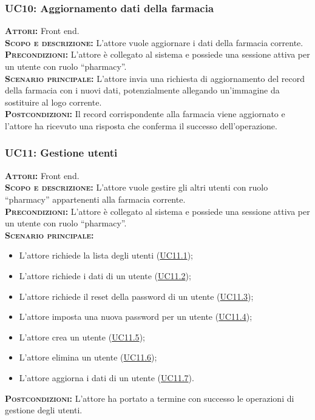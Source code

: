 \subsubsection{UC10: Aggiornamento dati della farmacia}
\label{sec:UC10}
\textsc{\textbf{Attori:}} Front end.\\
\textsc{\textbf{Scopo e descrizione:}} L'attore vuole aggiornare i dati della farmacia corrente.\\
\textsc{\textsc{\textbf{Precondizioni:}}} L'attore è collegato al sistema e possiede una sessione attiva per un utente con ruolo ``pharmacy''.\\
\textsc{\textbf{Scenario principale:}} L'attore invia una richiesta di aggiornamento del record della farmacia con i nuovi dati, potenzialmente allegando un'immagine da sostituire al logo corrente.\\
\textsc{\textbf{Postcondizioni:}} Il record corrispondente alla farmacia viene aggiornato e l'attore ha ricevuto una risposta che conferma il successo dell'operazione.

\subsubsection{UC11: Gestione utenti}
\label{sec:UC11}
\textsc{\textbf{Attori:}} Front end.\\
\textsc{\textbf{Scopo e descrizione:}} L'attore vuole gestire gli altri utenti con ruolo ``pharmacy'' appartenenti alla farmacia corrente.\\
\textsc{\textsc{\textbf{Precondizioni:}}} L'attore è collegato al sistema e possiede una sessione attiva per un utente con ruolo ``pharmacy''.\\
\textsc{\textbf{Scenario principale:}}
\begin{itemize}
    \item L'attore richiede la lista degli utenti (\hyperref[sec:UC111]{UC11.1});
    \item L'attore richiede i dati di un utente (\hyperref[sec:UC112]{UC11.2});
    \item L'attore richiede il reset della password di un utente (\hyperref[sec:UC113]{UC11.3});
    \item L'attore imposta una nuova password per un utente  (\hyperref[sec:UC114]{UC11.4});
    \item L'attore crea un utente (\hyperref[sec:UC115]{UC11.5});
    \item L'attore elimina un utente (\hyperref[sec:UC116]{UC11.6});
    \item L'attore aggiorna i dati di un utente (\hyperref[sec:UC117]{UC11.7}).
\end{itemize}
\textsc{\textbf{Postcondizioni:}} L'attore ha portato a termine con successo le operazioni di gestione degli utenti.

